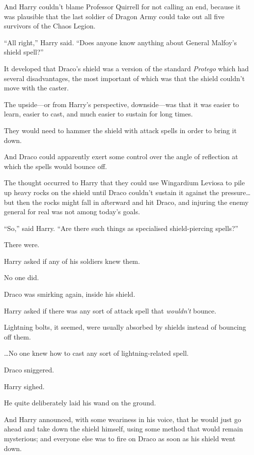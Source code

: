 And Harry couldn't blame Professor Quirrell for not calling an end,
because it was plausible that the last soldier of Dragon Army could take
out all five survivors of the Chaos Legion.

``All right,'' Harry said. ``Does anyone know anything about General
Malfoy's shield spell?''

It developed that Draco's shield was a version of the standard
\emph{Protego} which had several disadvantages, the most important of
which was that the shield couldn't move with the caster.

The upside---or from Harry's perspective, downside---was that it was
easier to learn, easier to cast, and much easier to sustain for long
times.

They would need to hammer the shield with attack spells in order to
bring it down.

And Draco could apparently exert some control over the angle of
reflection at which the spells would bounce off.

The thought occurred to Harry that they could use Wingardium Leviosa to
pile up heavy rocks on the shield until Draco couldn't sustain it
against the pressure\ldots{} but then the rocks might fall in afterward
and hit Draco, and injuring the enemy general for real was not among
today's goals.

``So,'' said Harry. ``Are there such things as specialised
shield-piercing spells?''

There were.

Harry asked if any of his soldiers knew them.

No one did.

Draco was smirking again, inside his shield.

Harry asked if there was any sort of attack spell that \emph{wouldn't}
bounce.

Lightning bolts, it seemed, were usually absorbed by shields instead of
bouncing off them.

\ldots{}No one knew how to cast any sort of lightning-related spell.

Draco sniggered.

Harry sighed.

He quite deliberately laid his wand on the ground.

And Harry announced, with some weariness in his voice, that he would
just go ahead and take down the shield himself, using some method that
would remain mysterious; and everyone else was to fire on Draco as soon
as his shield went down.


